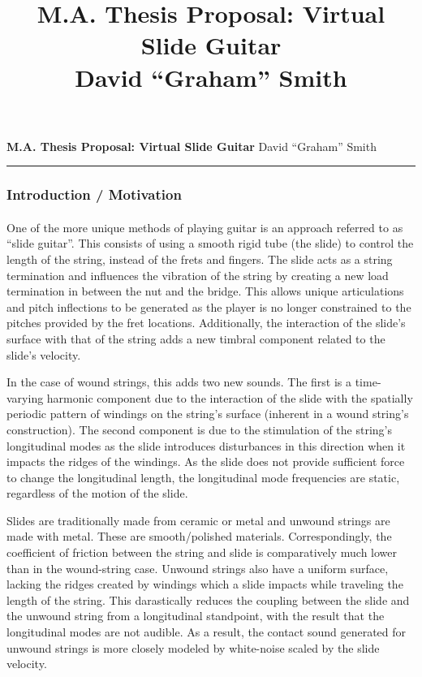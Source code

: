 \documentclass[12pt]{article}
\title{M.A. Thesis Proposal: Virtual Slide Guitar \\David ``Graham'' Smith}
\begin{document}

\begin{flushleft}
    \large \textbf{M.A. Thesis Proposal: Virtual Slide Guitar}
    \hfill
    \normalsize David ``Graham'' Smith
\end{flushleft}
\hrule

\subsubsection*{Introduction / Motivation}
\paragraph{}
One of the more unique methods of playing guitar is an approach referred to as “slide guitar”. This consists of using a smooth rigid tube (the slide) to control the length of the string, instead of the frets and fingers. The slide acts as a string termination and influences the vibration of the string by creating a new load termination in between the nut and the bridge. This allows unique articulations and pitch inflections to be generated as the player is no longer constrained to the pitches provided by the fret locations. Additionally, the interaction of the slide’s surface with that of the string adds a new timbral component related to the slide’s velocity. 

In the case of wound strings, this adds two new sounds. The first is a time-varying harmonic component due to the interaction of the slide with the spatially periodic pattern of windings on the string’s surface (inherent in a wound string’s construction).  The second component is due to the stimulation of the string’s longitudinal modes as the slide introduces disturbances in this direction when it impacts the ridges of the windings. As the slide does not provide sufficient force to change the longitudinal length, the longitudinal mode frequencies are static, regardless of the motion of the slide. 

Slides are traditionally made from ceramic or metal and unwound strings are made with metal. These are smooth/polished materials. Correspondingly, the coefficient of friction between the string and slide is comparatively much lower than in the wound-string case. Unwound strings also have a uniform surface, lacking the ridges created by windings which a slide impacts while traveling the length of the string. This darastically reduces the coupling between the slide and the unwound string from a longitudinal standpoint, with the result that the longitudinal modes are not audible. As a result, the contact sound generated for unwound strings is more closely modeled by white-noise scaled by the slide velocity. 
\end{document}
